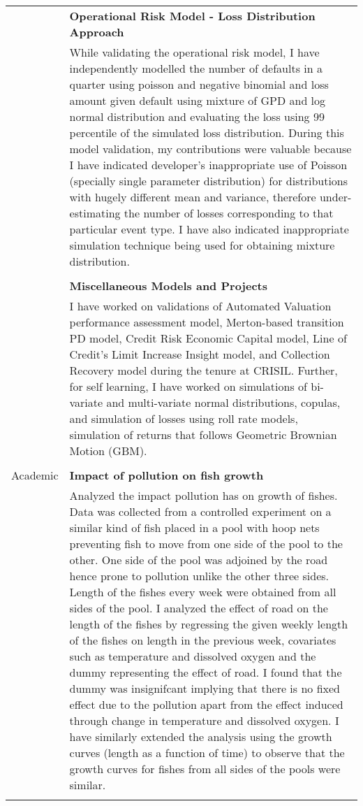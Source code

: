 \documentclass[a4paper,10pt]{article}
\begin{document}
\begin{tabular}{r|p{11cm}}
& \textbf{Operational Risk Model - Loss Distribution Approach } \\ &\footnotesize{While validating the operational risk model, I have independently modelled the number of defaults in a quarter using poisson and negative binomial and loss amount given default using mixture of GPD and log normal distribution and evaluating the loss using 99 percentile of the simulated loss distribution. During this model validation, my contributions were valuable because I have indicated developer's inappropriate use of Poisson (specially single parameter distribution) for distributions with hugely different mean and variance, therefore under-estimating the number of losses corresponding to that particular event type. I have also indicated inappropriate simulation technique being used for obtaining mixture distribution.} \\\multicolumn{2}{c}{} \\ 

&\textbf{Miscellaneous Models and Projects} \\ & \footnotesize{I have worked on validations of Automated Valuation performance assessment model, Merton-based transition PD model, Credit Risk Economic Capital model, Line of Credit's Limit Increase Insight model, and Collection Recovery model during the tenure at CRISIL. Further, for self learning, I have worked on simulations of bi-variate and multi-variate normal distributions, copulas, and simulation of losses using roll rate models, simulation of returns that follows Geometric Brownian Motion (GBM). } \\\multicolumn{2}{c}{} \\  

\Large{Academic} 
& \textbf{Impact of pollution on fish growth} \\ &\footnotesize{Analyzed the impact pollution has on growth of fishes. Data was collected from a controlled experiment on a similar kind of fish placed in a pool with hoop nets preventing fish to move from one side of the pool to the other. One side of the pool was adjoined by the road hence prone to pollution unlike the other three sides. Length of the fishes every week were obtained from all sides of the pool. I analyzed the effect of road on the length of the fishes by regressing the given weekly length of the fishes on length in the previous week, covariates such as temperature and dissolved oxygen and the dummy representing the effect of road. I found that the dummy was insignifcant implying that there is no fixed effect due to the pollution apart from the effect induced through change in temperature and dissolved oxygen. I have similarly extended the analysis using the growth curves (length as a function of time) to observe that the growth curves for fishes from all sides of the pools were similar. }\\\multicolumn{2}{c}{} \\

\end{tabular}
\end{document}
